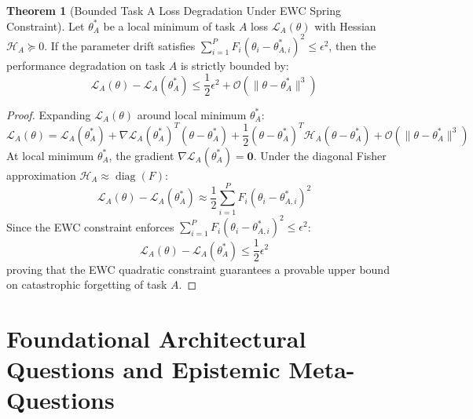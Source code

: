 \documentclass[11pt,a4paper]{article}
\theoremstyle{definition}
\newtheorem{theorem}{\textbf{Theorem}}[section]
\begin{document}
\begin{theorem}[Bounded Task A Loss Degradation Under EWC Spring Constraint]
Let $\theta_A^*$ be a local minimum of task $A$ loss $\mathcal{L}_A(\theta)$ with Hessian $\mathcal{H}_A \succeq 0$. If the parameter drift satisfies $\sum_{i=1}^P F_i (\theta_i - \theta_{A, i}^*)^2 \le \epsilon^2$, then the performance degradation on task $A$ is strictly bounded by:
{\boldmath
\begin{equation}
\mathcal{L}_A(\theta) - \mathcal{L}_A(\theta_A^*) \le \frac{1}{2} \epsilon^2 + \mathcal{O}(\|\theta - \theta_A^*\|^3)
\end{equation}
}
\end{theorem}

\begin{proof}
Expanding $\mathcal{L}_A(\theta)$ around local minimum $\theta_A^*$:
{\boldmath
\begin{equation}
\mathcal{L}_A(\theta) = \mathcal{L}_A(\theta_A^*) + \nabla \mathcal{L}_A(\theta_A^*)^T (\theta - \theta_A^*) + \frac{1}{2} (\theta - \theta_A^*)^T \mathcal{H}_A (\theta - \theta_A^*) + \mathcal{O}(\|\theta - \theta_A^*\|^3)
\end{equation}
}
At local minimum $\theta_A^*$, the gradient $\nabla \mathcal{L}_A(\theta_A^*) = \mathbf{0}$.
Under the diagonal Fisher approximation $\mathcal{H}_A \approx \operatorname{diag}(F)$:
{\boldmath
\begin{equation}
\mathcal{L}_A(\theta) - \mathcal{L}_A(\theta_A^*) \approx \frac{1}{2} \sum_{i=1}^P F_i (\theta_i - \theta_{A, i}^*)^2
\end{equation}
}
Since the EWC constraint enforces $\sum_{i=1}^P F_i (\theta_i - \theta_{A, i}^*)^2 \le \epsilon^2$:
{\boldmath
\begin{equation}
\mathcal{L}_A(\theta) - \mathcal{L}_A(\theta_A^*) \le \frac{1}{2} \epsilon^2
\end{equation}
}
proving that the EWC quadratic constraint guarantees a provable upper bound on catastrophic forgetting of task $A$.
\end{proof}

\section{Foundational Architectural Questions and Epistemic Meta-Questions}
\end{document}
